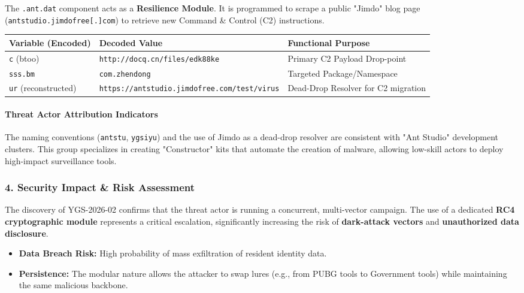 \documentclass[
]{article}
\begin{document}
The \texttt{.ant.dat} component acts as a \textbf{Resilience Module}. It
is programmed to scrape a public "Jimdo" blog page
(\texttt{antstudio.jimdofree{[}.{]}com}) to retrieve new Command \&
Control (C2) instructions.

\begin{longtable}[]{@{}lll@{}}
\toprule\noalign{}
Variable (Encoded) & Decoded Value & Functional Purpose \\
\midrule\noalign{}
\endhead
\bottomrule\noalign{}
\endlastfoot
\texttt{c} (btoo) & \texttt{http://docq.cn/files/edk88ke} & Primary C2
Payload Drop-point \\
\texttt{sss.bm} & \texttt{com.zhendong} & Targeted Package/Namespace \\
\texttt{ur} (reconstructed) &
\texttt{https://antstudio.jimdofree.com/test/virus} & Dead-Drop Resolver
for C2 migration \\
\end{longtable}

\paragraph{\texorpdfstring{\textbf{Threat Actor Attribution
Indicators}}{Threat Actor Attribution Indicators}}\label{threat-actor-attribution-indicators}

The naming conventions (\texttt{antstu}, \texttt{ygsiyu}) and the use of
Jimdo as a dead-drop resolver are consistent with "Ant Studio"
development clusters. This group specializes in creating "Constructor"
kits that automate the creation of malware, allowing low-skill actors to
deploy high-impact surveillance tools.

\subsubsection{\texorpdfstring{\textbf{4. Security Impact \& Risk
Assessment}}{4. Security Impact \& Risk Assessment}}\label{4-security-impact--risk-assessment}

The discovery of YGS-2026-02 confirms that the threat actor is running a
concurrent, multi-vector campaign. The use of a dedicated \textbf{RC4
cryptographic module} represents a critical escalation, significantly
increasing the risk of \textbf{dark-attack vectors} and
\textbf{unauthorized data disclosure}.

\begin{itemize}
\item
  \textbf{Data Breach Risk:} High probability of mass exfiltration of
  resident identity data.
\item
  \textbf{Persistence:} The modular nature allows the attacker to swap
  lures (e.g., from PUBG tools to Government tools) while maintaining
  the same malicious backbone.
\end{itemize}
\end{document}
